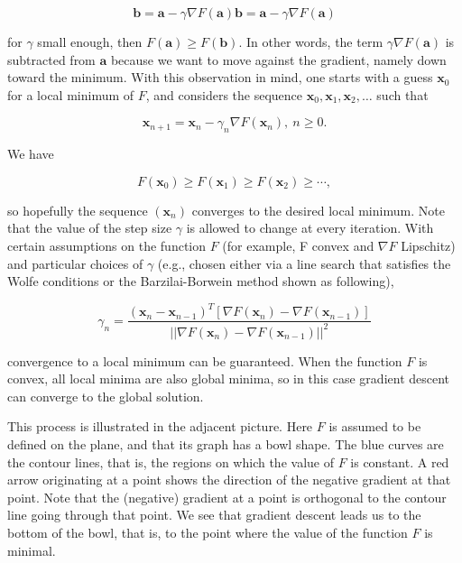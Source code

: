 \documentclass[11pt, a4paper]{report}
\begin{document}
\[ {\displaystyle \mathbf {b} =\mathbf {a} -\gamma \nabla F(\mathbf {a} )} \mathbf {b} =\mathbf {a} -\gamma \nabla F(\mathbf {a} ) \]

for \({\displaystyle \gamma }\)   small enough, then $ \displaystyle F(\mathbf {a}) \geq F(\mathbf {b}) $. In other words, the term \({\displaystyle \gamma \nabla F(\mathbf {a} )} \) is subtracted from $ \mathbf {a} $  because we want to move against the gradient, namely 
down toward the minimum. With this observation in mind, one starts with a guess $ \mathbf {x} _{0} $ for a local minimum of  $ F $, and considers the sequence $ \mathbf {x} _{0},\mathbf {x} _{1},\mathbf {x} _{2},\dots $ such that

\[ \mathbf {x} _{n+1}=\mathbf {x} _{n}-\gamma _{n}\nabla F(\mathbf {x} _{n}),\ n\geq 0. \]

We have

\[ F(\mathbf {x} _{0})\geq F(\mathbf {x} _{1})\geq F(\mathbf {x} _{2})\geq \cdots , \]

so hopefully the sequence  $ (\mathbf {x} _{n}) $ converges to the desired local minimum. Note that the value of the step size $ \gamma  $ is allowed to change at every iteration. With certain assumptions on the function $ F $ (for example,  F convex and $ \nabla F $ Lipschitz) and particular choices of  $ \gamma  $ (e.g., chosen either via a line search that satisfies the Wolfe conditions or the Barzilai-Borwein method shown as following),

\[ {\displaystyle \gamma _{n}={\frac {(\mathbf {x} _{n}-\mathbf {x} _{n-1})^{T}[\nabla F(\mathbf {x} _{n})-\nabla F(\mathbf {x} _{n-1})]}{||\nabla F(\mathbf {x} _{n})-\nabla F(\mathbf {x} _{n-1})||^{2}}}} \]

convergence to a local minimum can be guaranteed. When the function $ F $ is convex, all local minima are also global minima, so in this case gradient descent can converge to the global solution.

This process is illustrated in the adjacent picture. Here $ F $ is assumed to be defined on the plane, and that its graph has a bowl shape. The blue curves are the contour lines, that is, the regions on which the value of $ F $ is constant. A red arrow originating at a point shows the direction of the negative gradient at that point. Note that the (negative) gradient at a point is orthogonal to the contour line going through that point. We see that gradient descent leads us to the bottom of the bowl, that is, to the point where the value of the function $ F $ is minimal.
\cite{wiki:gradientDescent}
\end{document}
